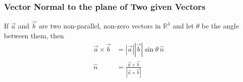 \begin{frame}
\frametitle{Vector Normal to the plane of Two given Vectors}
If \(\vec{a}\) and \(\vec{b}\) are two non-parallel, non-zero vectors in \(\mathbb{R}^3\) and let \(\theta\) be the angle between them, then 
\begin{align*}
    \vec{a} \times \vec{b} &= |\vec{a}| |\vec{b}| \sin \theta \, \hat{n} \\
    \hat{n} &= \frac{\vec{a} \times \vec{b}}{|\vec{a} \times \vec{b}|}
\end{align*}             
\end{frame}





